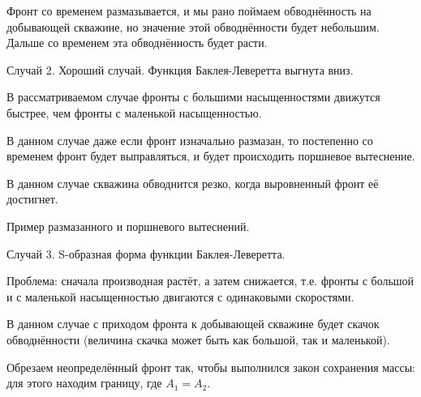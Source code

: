 \documentclass[main.tex]{subfiles}
\begin{document}
Фронт со временем размазывается, и мы рано поймаем обводнённость на добывающей скважине, но значение этой обводнённости будет небольшим. Дальше со временем эта обводнённость будет расти.


Случай 2. Хороший случай. Функция Баклея-Леверетта выгнута вниз.

В рассматриваемом случае фронты с большими насыщенностями движутся быстрее, чем фронты с маленькой насыщенностью.


В данном случае даже если фронт изначально размазан, то постепенно со временем фронт будет выправляться, и будет происходить поршневое вытеснение.

В данном случае скважина обводнится резко, когда выровненный фронт её достигнет.


Пример размазанного и поршневого вытеснений.


Случай 3. S-образная форма функции Баклея-Леверетта.

Проблема: сначала производная растёт, а затем снижается, т.е. фронты с большой и с маленькой насыщенностью двигаются с одинаковыми скоростями.


В данном случае с приходом фронта к добывающей скважине будет скачок обводнённости (величина скачка может быть как большой, так и маленькой).



Обрезаем неопределённый фронт так, чтобы выполнился закон сохранения массы: для этого находим границу, где $A_1=A_2$.

\end{document}
